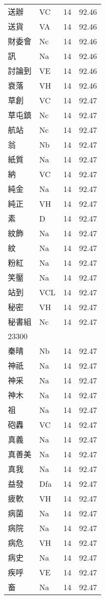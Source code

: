 \documentclass[twocolumn]{book}
\begin{document}
\begin{supertabular}{llrr}
送辦 & VC & 14 &  92.46\\
送貨 & VA & 14 &  92.46\\
財委會 & Nc & 14 &  92.46\\
訊 & Na & 14 &  92.46\\
討論到 & VE & 14 &  92.46\\
衰落 & VH & 14 &  92.46\\
草創 & VC & 14 &  92.47\\
草屯鎮 & Nc & 14 &  92.47\\
航站 & Nc & 14 &  92.47\\
翁 & Nb & 14 &  92.47\\
紙質 & Na & 14 &  92.47\\
納 & VC & 14 &  92.47\\
純金 & Na & 14 &  92.47\\
純正 & VH & 14 &  92.47\\
素 & D & 14 &  92.47\\
紋飾 & Na & 14 &  92.47\\
紋 & Na & 14 &  92.47\\
粉紅 & Na & 14 &  92.47\\
笑靨 & Na & 14 &  92.47\\
站到 & VCL & 14 &  92.47\\
秘密 & VH & 14 &  92.47\\
秘書組 & Nc & 14 &  92.47\\
23300\\
秦晴 & Nb & 14 &  92.47\\
神祇 & Na & 14 &  92.47\\
神采 & Na & 14 &  92.47\\
神木 & Na & 14 &  92.47\\
祖 & Na & 14 &  92.47\\
砲轟 & VC & 14 &  92.47\\
真義 & Na & 14 &  92.47\\
真善美 & Na & 14 &  92.47\\
真我 & Na & 14 &  92.47\\
益發 & Dfa & 14 &  92.47\\
疲軟 & VH & 14 &  92.47\\
病菌 & Na & 14 &  92.47\\
病院 & Na & 14 &  92.47\\
病危 & VH & 14 &  92.47\\
病史 & Na & 14 &  92.47\\
疾呼 & VE & 14 &  92.47\\
畜 & Na & 14 &  92.47\\

\end{supertabular}
\end{document}

